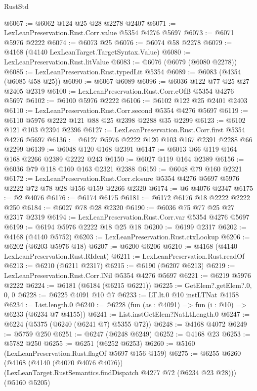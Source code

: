 \begin{lexlean}{RustStd}
\begin{coremodule}
@6067 := @6062 @124 @25 @28 @2278 @2407
@6071 := LexLeanPreservation.Rust.Corr.value @5354 @4276 @5697
@6073 := @6071 @5976 @2222
@6074 := @6073 @25
@6076 := @6074 @58 @2278
@6079 := @4168 (@4140 LexLeanTarget.TargetSyntax.Value)
@6080 := LexLeanPreservation.Rust.litValue
@6083 := @6076 (@6079 (@6080 @2278))
@6085 := LexLeanPreservation.Rust.typedLit @5354
@6089 := @6083 (@4354 (@6085 @58 @25))
@6090 := @6067 @6089
@6096 := @6036 @122 @77 @25 @27 @2405 @2319
@6100 := LexLeanPreservation.Rust.Corr.eOfB @5354 @4276 @5697
@6102 := @6100 @5976 @2222
@6106 := @6102 @122 @25 @2401 @2403
@6110 := LexLeanPreservation.Rust.Corr.second @5354 @4276 @5697
@6119 := @6110 @5976 @2222 @121 @88 @25 @2398 @2288 @35 @2299
@6123 := @6102 @121 @103 @2394 @2396
@6127 := LexLeanPreservation.Rust.Corr.first @5354 @4276 @5697
@6136 := @6127 @5976 @2222 @120 @103 @167 @2391 @2288 @66 @2299
@6139 := @6048 @120 @168 @2391
@6147 := @6013 @66 @119 @164 @168 @2266 @2389 @2222 @243
@6150 := @6027 @119 @164 @2389
@6156 := @6036 @79 @118 @160 @163 @2321 @2388
@6159 := @6048 @79 @160 @2321
@6172 := LexLeanPreservation.Rust.Corr.closure
    @5354
    @4276
    @5697
    @5976
    @2222
    @72
    @78
    @28
    @156
    @159
    @2266
    @2320
@6174 := @6 @4076 @2347
@6175 := @2 @4076
@6176 := @6174 @6175
@6181 := @6172 @6176 @18 @2222 @2222 @250
@6184 := @6027 @78 @28 @2320
@6190 := @6036 @75 @77 @25 @27 @2317 @2319
@6194 := LexLeanPreservation.Rust.Corr.var @5354 @4276 @5697
@6199 := @6194 @5976 @2222 @18 @25 @18
@6200 := @6199 @2317
@6202 := @4168 (@4140 @5752)
@6203 := LexLeanPreservation.Rust.ctxLookup
@6206 := @6202 (@6203 @5976 @18)
@6207 := @6200 @6206
@6210 := @4168 (@4140 LexLeanPreservation.Rust.RIdent)
@6211 := LexLeanPreservation.Rust.readOf
@6213 := @6210 (@6211 @2317)
@6215 := @6190 (@6207 @6213)
@6219 := LexLeanPreservation.Rust.Corr.lNil @5354 @4276 @5697
@6221 := @6219 @5976 @2222
@6224 := @6181 (@6184 (@6215 @6221))
@6225 := GetElem?.getElem?.{0, 0, 0}
@6228 := @6225 @4091 @10 @7
@6233 := LT.lt.{0} @10 instLTNat @4158
@6234 := List.length.{0}
@6240 := @6228 (fun (as : @4091) => fun (i : @10) => @6233 (@6234 @7 @4155))
@6241 := List.instGetElem?NatLtLength.{0}
@6247 := @6224 (@5375 (@6240 (@6241 @7) @5355 @72))
@6248 := @4168 @4072
@6249 := @5759 @250
@6251 := @6247 (@6248 @6249)
@6252 := @4168 @23
@6253 := @5782 @250
@6255 := @6251 (@6252 @6253)
@6260 := @5160 (LexLeanPreservation.Rust.flagOf @5697 @156 @159)
@6275 := @6255
    @6260
    (@4168
      (@4140 (@4070 @4076 @4076))
      (LexLeanTarget.RustSemantics.findDispatch @4277 @72 (@6234 @23 @28)))
    (@5160 @5205)

\end{coremodule}
\end{lexlean}

